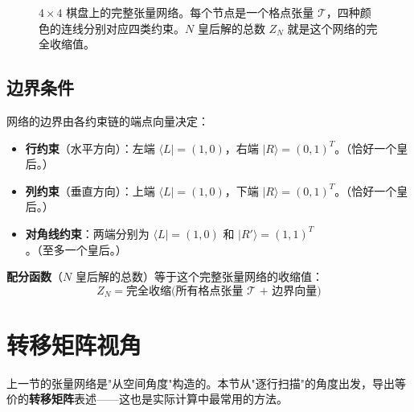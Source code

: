 \documentclass[12pt,a4paper]{ctexart}
\begin{document}
\begin{figure}[H]
\caption{$4 \times 4$ 棋盘上的完整张量网络。每个节点是一个格点张量 $\mathcal{T}$，四种颜色的连线分别对应四类约束。$N$ 皇后解的总数 $Z_N$ 就是这个网络的完全收缩值。}
\end{figure}

\subsection{边界条件}

网络的边界由各约束链的端点向量决定：
\begin{itemize}
    \item \textbf{行约束}（水平方向）：左端 $\langle L| = (1,0)$，右端 $|R\rangle = (0,1)^T$。（恰好一个皇后。）
    \item \textbf{列约束}（垂直方向）：上端 $\langle L| = (1,0)$，下端 $|R\rangle = (0,1)^T$。（恰好一个皇后。）
    \item \textbf{对角线约束}：两端分别为 $\langle L| = (1,0)$ 和 $|R'\rangle = (1,1)^T$。（至多一个皇后。）
\end{itemize}

\textbf{配分函数}（$N$ 皇后解的总数）等于这个完整张量网络的收缩值：
\begin{equation}
\boxed{Z_N = \text{完全收缩}\Big(\text{所有格点张量 } \mathcal{T} \text{ + 边界向量}\Big)}
\end{equation}

\section{转移矩阵视角}

上一节的张量网络是"从空间角度"构造的。本节从"逐行扫描"的角度出发，导出等价的\textbf{转移矩阵}表述——这也是实际计算中最常用的方法。
\end{document}
